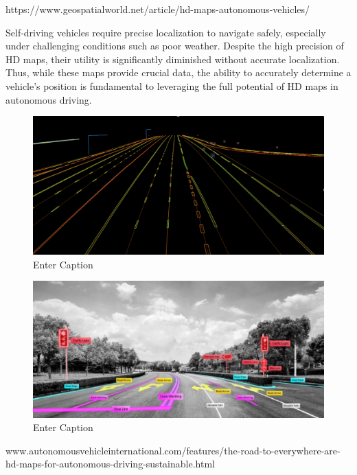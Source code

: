 https://www.geospatialworld.net/article/hd-maps-autonomous-vehicles/

Self-driving vehicles require precise localization to navigate safely, especially under challenging conditions such as poor weather. 
Despite the high precision of HD maps, their utility is significantly diminished without accurate localization. Thus, while these maps provide crucial data, the ability to accurately determine a vehicle's position is fundamental to leveraging the full potential of HD maps in autonomous driving.

\begin{figure}
    \centering
    \includegraphics[width=1\linewidth]{LateX/figs/Screenshot-2021-07-16-at-17.00.59-e1626451336528.png}
    \caption{Enter Caption}
    \label{fig:enter-label}   
\end{figure}


\begin{figure}
    \centering
    \includegraphics[width=1\linewidth]{LateX/figs/35493487c9d025c81f4e9ed21722d458_1612794598859.jpg}
    \caption{Enter Caption}
    \label{fig:enter-label}
\end{figure}


www.autonomousvehicleinternational.com/features/the-road-to-everywhere-are-hd-maps-for-autonomous-driving-sustainable.html 

